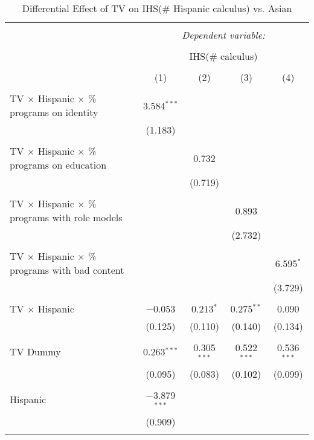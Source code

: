 
\begin{table}[!htbp] \centering 
  \caption{Differential Effect of TV on IHS(\# Hispanic calculus) vs. Asian} 
  \label{} 
\begin{tabular}{@{\extracolsep{-2pt}}lcccc} 
\\[-1.8ex]\hline 
\hline \\[-1.8ex] 
 & \multicolumn{4}{c}{\textit{Dependent variable:}} \\ 
\cline{2-5} 
\\[-1.8ex] & \multicolumn{4}{c}{IHS(\# calculus)} \\ 
\\[-1.8ex] & (1) & (2) & (3) & (4)\\ 
\hline \\[-1.8ex] 
 TV $\times$ Hispanic $\times$ \% programs on identity & 3.584$^{***}$ &  &  &  \\ 
  & (1.183) &  &  &  \\ 
  & & & & \\ 
 TV $\times$ Hispanic $\times$ \% programs on education &  & 0.732 &  &  \\ 
  &  & (0.719) &  &  \\ 
  & & & & \\ 
 TV $\times$ Hispanic $\times$ \% programs with role models &  &  & 0.893 &  \\ 
  &  &  & (2.732) &  \\ 
  & & & & \\ 
 TV $\times$ Hispanic $\times$ \% programs with bad content &  &  &  & 6.595$^{*}$ \\ 
  &  &  &  & (3.729) \\ 
  & & & & \\ 
 TV $\times$ Hispanic & $-$0.053 & 0.213$^{*}$ & 0.275$^{**}$ & 0.090 \\ 
  & (0.125) & (0.110) & (0.140) & (0.134) \\ 
  & & & & \\ 
 TV Dummy & 0.263$^{***}$ & 0.305$^{***}$ & 0.522$^{***}$ & 0.536$^{***}$ \\ 
  & (0.095) & (0.083) & (0.102) & (0.099) \\ 
  & & & & \\ 
 Hispanic & $-$3.879$^{***}$ &  &  &  \\ 
  & (0.909) &  &  &  \\ 
  & & & & \\ 

\end{tabular}
\end{table}
